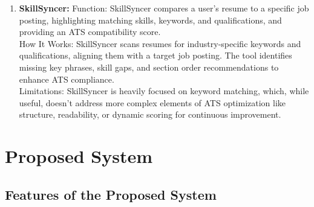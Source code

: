 \documentclass[12pt,a4paper]{report}
\begin{document}
\begin{enumerate}
\item \textbf{SkillSyncer:} Function: SkillSyncer compares a user’s resume to a specific job posting, highlighting matching skills, keywords, and qualifications, and providing an ATS compatibility score.\\
How It Works: SkillSyncer scans resumes for industry-specific keywords and qualifications, aligning them with a target job posting. The tool identifies missing key phrases, skill gaps, and section order recommendations to enhance ATS compliance.\\
Limitations: SkillSyncer is heavily focused on keyword matching, which, while useful, doesn’t address more complex elements of ATS optimization like structure, readability, or dynamic scoring for continuous improvement.
\end{enumerate}
\chapter{Proposed System}


\section{Features of the Proposed System}
\end{document}
